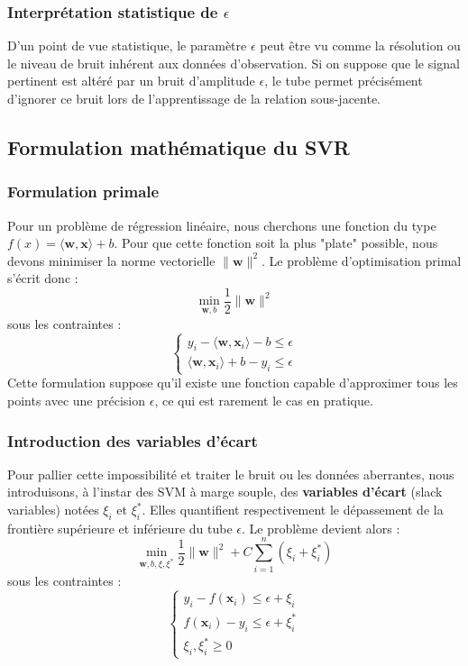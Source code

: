 \subsubsection{Interprétation statistique de $\epsilon$}
D'un point de vue statistique, le paramètre $\epsilon$ peut être vu comme la résolution ou le niveau de bruit inhérent aux données d'observation. Si on suppose que le signal pertinent est altéré par un bruit d'amplitude $\epsilon$, le tube permet précisément d'ignorer ce bruit lors de l'apprentissage de la relation sous-jacente.

\subsection{Formulation mathématique du SVR}

\subsubsection{Formulation primale}
Pour un problème de régression linéaire, nous cherchons une fonction du type $f(x) = \langle \mathbf{w}, \mathbf{x} \rangle + b$. Pour que cette fonction soit la plus "plate" possible, nous devons minimiser la norme vectorielle $\|\mathbf{w}\|^2$. Le problème d'optimisation primal s'écrit donc :
\begin{equation}
\min_{\mathbf{w}, b} \frac{1}{2} \|\mathbf{w}\|^2
\end{equation}
sous les contraintes :
\begin{equation}
\begin{cases}
y_i - \langle \mathbf{w}, \mathbf{x}_i \rangle - b \leq \epsilon \\
\langle \mathbf{w}, \mathbf{x}_i \rangle + b - y_i \leq \epsilon
\end{cases}
\end{equation}
Cette formulation suppose qu'il existe une fonction capable d'approximer tous les points avec une précision $\epsilon$, ce qui est rarement le cas en pratique.

\subsubsection{Introduction des variables d'écart}
Pour pallier cette impossibilité et traiter le bruit ou les données aberrantes, nous introduisons, à l'instar des SVM à marge souple, des \textbf{variables d'écart} (slack variables) notées $\xi_i$ et $\xi_i^*$. Elles quantifient respectivement le dépassement de la frontière supérieure et inférieure du tube $\epsilon$. Le problème devient alors :
\begin{equation}
\min_{\mathbf{w}, b, \xi, \xi^*} \frac{1}{2} \|\mathbf{w}\|^2 + C \sum_{i=1}^{n} (\xi_i + \xi_i^*)
\end{equation}
sous les contraintes :
\begin{equation}
\begin{cases}
y_i - f(\mathbf{x}_i) \leq \epsilon + \xi_i \\
f(\mathbf{x}_i) - y_i \leq \epsilon + \xi_i^* \\
\xi_i, \xi_i^* \geq 0
\end{cases}
\label{eq:svr_primal}
\end{equation}

